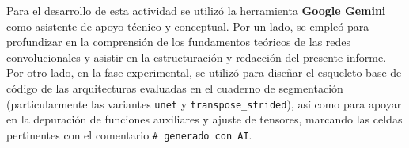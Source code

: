 \documentclass[10pt,letterpaper]{article}
\newcommand{\sangria}{\hspace*{1.5em}}
\begin{document}
\sangria Para el desarrollo de esta actividad se utilizó la herramienta \textbf{Google Gemini} como asistente de apoyo técnico y conceptual. Por un lado, se empleó para profundizar en la comprensión de los fundamentos teóricos de las redes convolucionales y asistir en la estructuración y redacción del presente informe. Por otro lado, en la fase experimental, se utilizó para diseñar el esqueleto base de código de las arquitecturas evaluadas en el cuaderno de segmentación (particularmente las variantes \texttt{unet} y \texttt{transpose\_strided}), así como para apoyar en la depuración de funciones auxiliares y ajuste de tensores, marcando las celdas pertinentes con el comentario \texttt{\# generado con AI}.
\end{document}
